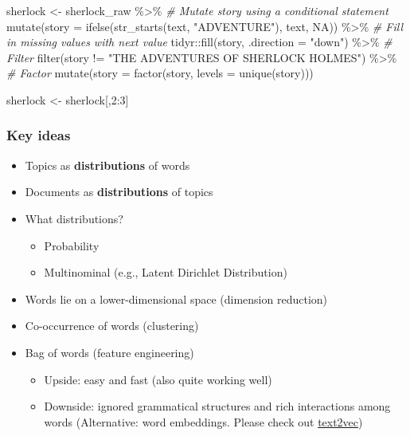 \documentclass[
]{book}
\newenvironment{Shaded}{\begin{snugshade}}{\end{snugshade}}
\newcommand{\AttributeTok}[1]{\textcolor[rgb]{0.77,0.63,0.00}{#1}}
\newcommand{\CommentTok}[1]{\textcolor[rgb]{0.56,0.35,0.01}{\textit{#1}}}
\newcommand{\ConstantTok}[1]{\textcolor[rgb]{0.00,0.00,0.00}{#1}}
\newcommand{\DecValTok}[1]{\textcolor[rgb]{0.00,0.00,0.81}{#1}}
\newcommand{\FunctionTok}[1]{\textcolor[rgb]{0.00,0.00,0.00}{#1}}
\newcommand{\NormalTok}[1]{#1}
\newcommand{\OtherTok}[1]{\textcolor[rgb]{0.56,0.35,0.01}{#1}}
\newcommand{\SpecialCharTok}[1]{\textcolor[rgb]{0.00,0.00,0.00}{#1}}
\newcommand{\StringTok}[1]{\textcolor[rgb]{0.31,0.60,0.02}{#1}}
\providecommand{\tightlist}{%
  \setlength{\itemsep}{0pt}\setlength{\parskip}{0pt}}
\begin{document}
\begin{Shaded}
\begin{Highlighting}[]
\NormalTok{sherlock }\OtherTok{\textless{}{-}}\NormalTok{ sherlock\_raw }\SpecialCharTok{\%\textgreater{}\%}
  \CommentTok{\# Mutate story using a conditional statement }
  \FunctionTok{mutate}\NormalTok{(}\AttributeTok{story =} \FunctionTok{ifelse}\NormalTok{(}\FunctionTok{str\_starts}\NormalTok{(text, }\StringTok{"ADVENTURE"}\NormalTok{), }
\NormalTok{                                   text, }\ConstantTok{NA}\NormalTok{)) }\SpecialCharTok{\%\textgreater{}\%}
  \CommentTok{\# Fill in missing values with next value  }
\NormalTok{  tidyr}\SpecialCharTok{::}\FunctionTok{fill}\NormalTok{(story, }\AttributeTok{.direction =} \StringTok{"down"}\NormalTok{) }\SpecialCharTok{\%\textgreater{}\%}
  \CommentTok{\# Filter }
  \FunctionTok{filter}\NormalTok{(story }\SpecialCharTok{!=} \StringTok{"THE ADVENTURES OF SHERLOCK HOLMES"}\NormalTok{) }\SpecialCharTok{\%\textgreater{}\%}
  \CommentTok{\# Factor }
  \FunctionTok{mutate}\NormalTok{(}\AttributeTok{story =} \FunctionTok{factor}\NormalTok{(story, }\AttributeTok{levels =} \FunctionTok{unique}\NormalTok{(story)))}

\NormalTok{sherlock }\OtherTok{\textless{}{-}}\NormalTok{ sherlock[,}\DecValTok{2}\SpecialCharTok{:}\DecValTok{3}\NormalTok{]}
\end{Highlighting}
\end{Shaded}

\hypertarget{key-ideas}{%
\subsubsection{Key ideas}\label{key-ideas}}

\begin{itemize}
\item
  Topics as \textbf{distributions} of words
\item
  Documents as \textbf{distributions} of topics
\item
  What distributions?

  \begin{itemize}
  \item
    Probability
  \item
    Multinominal (e.g., Latent Dirichlet Distribution)
  \end{itemize}
\item
  Words lie on a lower-dimensional space (dimension reduction)
\item
  Co-occurrence of words (clustering)
\item
  Bag of words (feature engineering)

  \begin{itemize}
  \tightlist
  \item
    Upside: easy and fast (also quite working well)
  \item
    Downside: ignored grammatical structures and rich interactions among words (Alternative: word embeddings. Please check out \href{http://text2vec.org/}{text2vec})
  \end{itemize}
\end{itemize}
\end{document}
